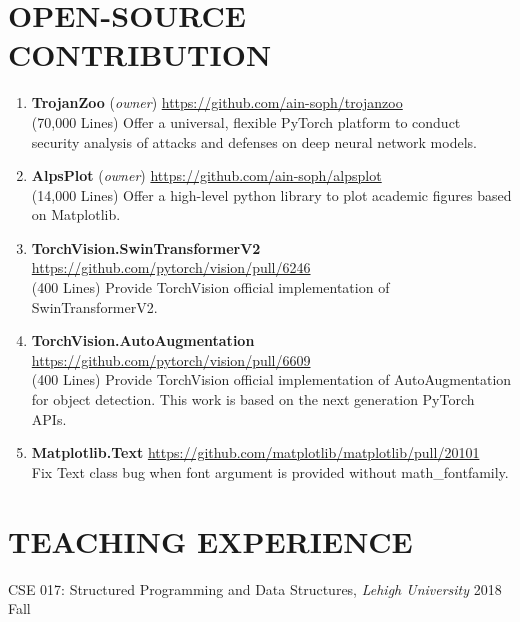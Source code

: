 \documentclass[letterpaper,11pt]{article}
\newcommand{\sociallink}[3]{\mbox{{#1}\hspace{0.5em}\href{#2}{#3}\hspace{1em}}}
\newcommand*{\website}[1]{\sociallink{\faGithub}{#1}{#1}}
\begin{document}
\section{OPEN-SOURCE CONTRIBUTION}

\begin{enumerate}[labelsep=15pt, parsep=4pt]

    \item \textbf{TrojanZoo} (\textit{owner}) \hfill \website{https://github.com/ain-soph/trojanzoo}
    \vspace{0.3em}\\
    (70,000 Lines) Offer a universal, flexible PyTorch platform to conduct security analysis of attacks and defenses on deep neural network models.

    \item \textbf{AlpsPlot} (\textit{owner}) \hfill \website{https://github.com/ain-soph/alpsplot}
    \vspace{0.3em}\\
    (14,000 Lines) Offer a high-level python library to plot academic figures based on Matplotlib.
    
    \item \textbf{TorchVision.SwinTransformerV2} \hfill
    \website{https://github.com/pytorch/vision/pull/6246}
    \vspace{0.3em}\\
    (400 Lines) Provide TorchVision official implementation of SwinTransformerV2.

    \item \textbf{TorchVision.AutoAugmentation} \hfill
    \website{https://github.com/pytorch/vision/pull/6609}
    \vspace{0.3em}\\
    (400 Lines) Provide TorchVision official implementation of AutoAugmentation for object detection. This work is based on the next generation PyTorch APIs.

    \item \textbf{Matplotlib.Text} \hfill
    \website{https://github.com/matplotlib/matplotlib/pull/20101}
    \vspace{0.3em}\\
    Fix Text class bug when font argument is provided without math\_fontfamily.


\end{enumerate}

\section{TEACHING EXPERIENCE}
CSE 017: Structured Programming and Data Structures, \textit{Lehigh University}  \hfill 2018 Fall \vspace{3pt}\\
\end{document}
